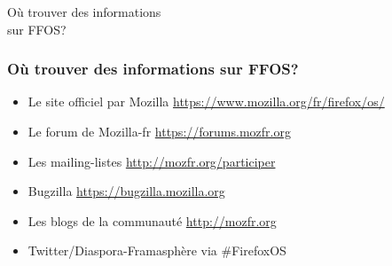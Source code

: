 \documentclass{beamer}
\begin{document}
\begin{frame}
\begin{center}
\Huge{Où trouver des informations \\ sur FFOS?}
\end{center}
\end{frame}
\begin{frame}
\frametitle{Où trouver des informations sur FFOS?}
\begin{itemize}
\item Le site officiel par Mozilla \url{https://www.mozilla.org/fr/firefox/os/}
\item Le forum de Mozilla-fr \url{https://forums.mozfr.org}
\item Les mailing-listes \url{http://mozfr.org/participer}
\item Bugzilla \url{https://bugzilla.mozilla.org}
\item Les blogs de la communauté \url{http://mozfr.org}
\item Twitter/Diaspora-Framasphère via \#FirefoxOS
\end{itemize}
\end{frame}
\end{document}
